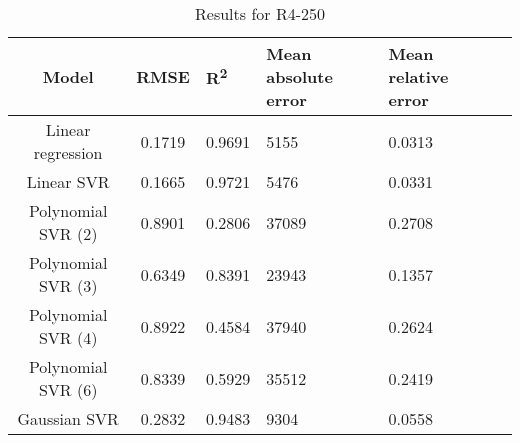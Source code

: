 \begin{table}[H]
\centering
\begin{adjustbox}{center}
\begin{tabular}{c | c M{1.2cm} M{2.5cm} M{2.5cm} M{1.8cm}}
Model & RMSE & R\textsuperscript{2} & Mean absolute error & Mean relative error \tabularnewline
\hline
Linear regression & 0.1719 & 0.9691 &   5155 & 0.0313 \\
Linear SVR & 0.1665 & 0.9721 &   5476 & 0.0331 \\
Polynomial SVR (2) & 0.8901 & 0.2806 &  37089 & 0.2708 \\
Polynomial SVR (3) & 0.6349 & 0.8391 &  23943 & 0.1357 \\
Polynomial SVR (4) & 0.8922 & 0.4584 &  37940 & 0.2624 \\
Polynomial SVR (6) & 0.8339 & 0.5929 &  35512 & 0.2419 \\
Gaussian SVR & 0.2832 & 0.9483 &   9304 & 0.0558 \\
\end{tabular}
\end{adjustbox}
\\
\caption{Results for R4-250}
\label{tab:coreonly_linear_R4_250}
\end{table}
